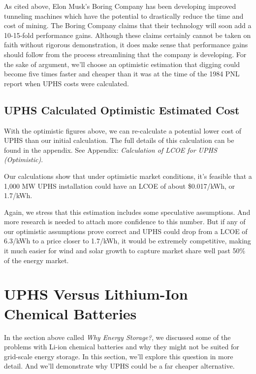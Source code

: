 \documentclass[hidelinks,12pt,a4paper]{article}
\begin{document}
As cited above, Elon Musk's Boring Company has been developing improved tunneling machines which have the potential to drastically reduce the time and cost of mining. The Boring Company claims that their technology will soon add a 10-15-fold performance gains. Although these claims certainly cannot be taken on faith without rigorous demonstration, it does make sense that performance gains should follow from the process streamlining that the company is developing. For the sake of argument, we'll choose an optimistic estimation that digging could become five times faster and cheaper than it was at the time of the 1984 PNL report when UPHS costs were calculated.

\subsection{UPHS Calculated Optimistic Estimated Cost}
With the optimistic figures above, we can re-calculate a potential lower cost of UPHS than our initial calculation. The full details of this calculation can be found in the appendix. See Appendix: \textit{Calculation of LCOE for UPHS (Optimistic)}.

\begin{displayquote}
Our calculations show that under optimistic market conditions, it's feasible that a 1,000 MW UPHS installation could have an LCOE of about \$0.017/kWh, or 1.7\cent /kWh.
\end{displayquote}

Again, we stress that this estimation includes some speculative assumptions. And more research is needed to attach more confidence to this number. But if any of our optimistic assumptions prove correct and UPHS could drop from a LCOE of 6.3\cent /kWh to a price closer to 1.7\cent /kWh, it would be extremely competitive, making it much easier for wind and solar growth to capture market share well past 50\% of the energy market.

\pagebreak[2]
\section{UPHS Versus Lithium-Ion Chemical Batteries}
In the section above called \textit{Why Energy Storage?}, we discussed some of the problems with Li-ion chemical batteries and why they might not be suited for grid-scale energy storage. In this section, we'll explore this question in more detail. And we'll demonstrate why UPHS could be a far cheaper alternative.
\end{document}
